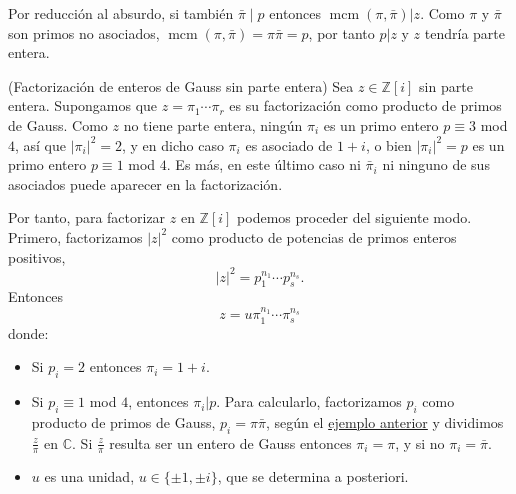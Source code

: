
Por reducción al absurdo, si también \(\bar{\pi}\mid p\) entonces
\(\operatorname{mcm}(\pi,\bar{\pi})|z\). Como \(\pi\) y \(\bar{\pi}\)
son primos no asociados,
\(\operatorname{mcm}(\pi,\bar{\pi})=\pi\bar{\pi}=p\), por tanto \(p|z\)
y \(z\) tendría parte entera. 

\textrm{\normalfont (Factorización de enteros de Gauss sin parte entera)}\label{exm:nointeger}
Sea \(z\in\mathbb{Z}[i]\) sin parte entera. Supongamos que
\(z=\pi_1\cdots\pi_r\) es su factorización como producto de primos de
Gauss. Como \(z\) no tiene parte entera, ningún \(\pi_i\) es un primo
entero \(p\equiv 3\) mod \(4\), así que \(|\pi_i|^2=2\), y en dicho caso
\(\pi_i\) es asociado de \(1+i\), o bien \(|\pi_i|^2=p\) es un primo
entero \(p\equiv 1\) mod \(4\). Es más, en este último caso ni
\(\bar{\pi}_i\) ni ninguno de sus asociados puede aparecer en la
factorización.

Por tanto, para factorizar \(z\) en \(\mathbb{Z}[i]\) podemos proceder
del siguiente modo. Primero, factorizamos \(|z|^2\) como producto de
potencias de primos enteros positivos,
\[|z|^2 = p_1^{n_1}\cdots p_s^{n_s}.\] Entonces
\[z=u\pi_1^{n_1}\cdots \pi_s^{n_s}\] donde:

\begin{itemize}
\item
  Si \(p_i=2\) entonces \(\pi_i=1+i\).
\item
  Si \(p_i\equiv 1\) mod \(4\), entonces \(\pi_i|p\). Para calcularlo,
  factorizamos \(p_i\) como producto de primos de Gauss,
  \(p_i=\pi\bar{\pi}\), según el
  \protect\hyperlink{exm:prime1mod4}{ejemplo anterior} y dividimos
  \(\frac{z}{\pi}\) en \(\mathbb{C}\). Si \(\frac{z}{\pi}\) resulta ser
  un entero de Gauss entonces \(\pi_i=\pi\), y si no
  \(\pi_i=\bar{\pi}\).
\item
  \(u\) es una unidad, \(u\in\{\pm1,\pm i\}\), que se determina a
  posteriori.
\end{itemize}

